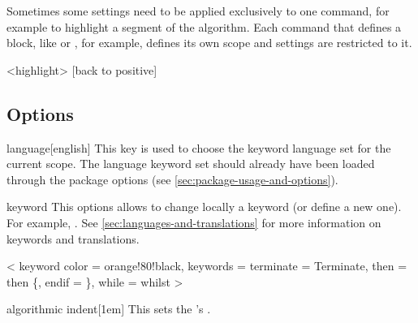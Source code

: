 \documentclass[a4paper, 11pt]{article}
\begin{document}
Sometimes some settings need to be applied exclusively to one command, for example to highlight a segment of the algorithm. Each command that defines a block, like  or , for example, defines its own scope and settings are restricted to it.

\begin{tcblisting}{}
    \begin{algorithmic}
        <highlight>
            [back to positive]
        \EndIf
    \end{algorithmic}
\end{tcblisting}

\subsection{Options}

\begin{option}{language}{}[english]
    This key is used to choose the keyword language set for the current scope. The language keyword set should already have been loaded through the package options (see \cref{sec:package-usage-and-options}).
\end{option}

\begin{option}{keyword}{}
    This options allows to change locally a keyword (or define a new one). For example, . See \cref{sec:languages-and-translations} for more information on keywords and translations.
\end{option}

\begin{tcblisting}{}
    \begin{algorithmic}
        <
        keyword color = orange!80!black,
        keywords = {terminate = Terminate, then = then \{, endif = \}, while = whilst}
        >
        \While{\True}
            \EndIf
        \EndWhile
    \end{algorithmic}
\end{tcblisting}

\begin{option}{algorithmic indent}{}[1em]
    This sets the 's .
\end{option}
\end{document}
